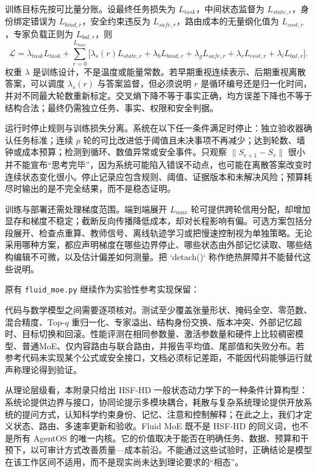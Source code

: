 训练目标先按可比量分账。设最终任务损失为 $L_{task}$，中间状态监督为 $L_{state,r}$，身份绑定错误为 $L_{bind,r}$，安全约束违反为 $L_{safe,r}$，路由成本的无量纲化值为 $L_{cost,r}$，专家负载正则为 $L_{bal,r}$，则
\begin{equation}
\mathcal L=\lambda_{task}L_{task}
+\sum_{r=0}^{L_{max}}\bigl[
\lambda_s(r)L_{state,r}+\lambda_bL_{bind,r}
+\lambda_gL_{safe,r}+\lambda_cL_{cost,r}+\lambda_lL_{bal,r}\bigr].
\end{equation}
权重 $\lambda$ 是训练设计，不是温度或能量常数。若早期重视连续表示、后期重视离散答案，可以调度 $\lambda_s(r)$ 与答案监督，但必须说明 $r$ 是循环编号还是归一化时间，并对不同最大轮数重新标定。交叉熵下降不等于事实正确，均方误差下降也不等于结构合法；最终仍需独立任务、事实、权限和安全判据。

运行时停止规则与训练损失分离。系统在以下任一条件满足时停止：独立验收器确认任务标准；连续 $p$ 轮的可比改进低于阈值且未决事项不再减少；达到轮数、墙钟或成本预算；检测到循环、数值异常或安全事件。只观察 $\lVert S_{r+1}-S_r\rVert$ 很小并不能宣布“思考完毕”，因为系统可能陷入错误不动点，也可能在离散答案改变时连续状态变化很小。停止记录应包含规则、阈值、证据版本和未解决风险；预算耗尽时输出的是不完全结果，而不是稳态证明。

训练与部署还需处理梯度范围。端到端展开 $L_{max}$ 轮可提供跨轮信用分配，却增加显存和梯度不稳定；截断反向传播降低成本，却对长程影响有偏。可选方案包括分段展开、检查点重算、教师信号、离线轨迹学习或把慢速控制视为单独策略。无论采用哪种方案，都应声明梯度在哪些边界停止、哪些状态由外部记忆读取、哪些结构编辑不可微，以及估计偏差如何测量。把 `detach()` 称作绝热屏障并不能替代这些说明。

原有 \texttt{fluid\_moe.py} 继续作为实验性参考实现保留：


代码与数学模型之间需要逐项核对。测试至少覆盖张量形状、掩码全空、零范数、混合精度、Top-$q$ 重归一化、专家溢出、结构身份交换、版本冲突、外部记忆超时、目标切换和回滚。性能评测在相同参数量、激活参数量和硬件上比较稠密模型、普通MoE、仅内容路由与联合路由，并报告平均值、尾部值和失败分布。若参考代码未实现某个公式或安全接口，文档必须标记差距，不能因代码能够运行就声称理论得到验证。

从理论层级看，本附录只给出 HSF-HD 一般状态动力学下的一种条件计算构型：系统论提供边界与接口，协同论提示多模块耦合，耗散与复杂系统理论提供开放系统的提问方式，认知科学约束身份、记忆、注意和控制解释；在此之上，我们才定义状态、路由、多速率更新和验收。Fluid MoE 既不是 HSF-HD 的同义词，也不是所有 AgentOS 的唯一内核。它的价值取决于能否在明确任务、数据、预算和干预下，以可审计方式改善质量—成本前沿。不能通过这些试验时，正确结论是模型在该工作区间不适用，而不是现实尚未达到理论要求的“相态”。
